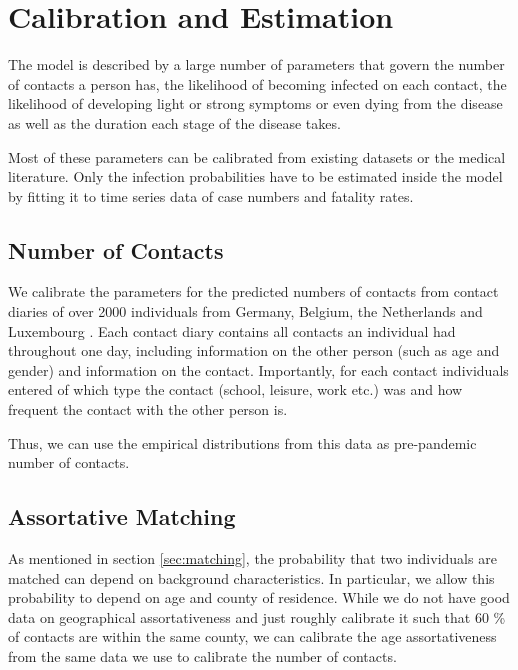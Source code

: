 \section{Calibration and Estimation}
\label{sec:calibration_and_estimation}

The model is described by a large number of parameters that govern the number of
contacts a person has, the likelihood of becoming infected on each contact, the
likelihood of developing light or strong symptoms or even dying from the disease as well
as the duration each stage of the disease takes.

Most of these parameters can be calibrated from existing datasets or the medical
literature. Only the infection probabilities have to be estimated inside the model by
fitting it to time series data of case numbers and fatality rates.





\subsection{Number of Contacts}
\label{sub:number_of_contacts}

We calibrate the parameters for the predicted numbers of contacts from contact diaries
of over 2000 individuals from Germany, Belgium, the Netherlands and Luxembourg
\citep{Mossong2008}. Each contact diary contains all contacts an individual had
throughout one day, including information on the other person (such as age and gender)
and information on the contact. Importantly, for each contact individuals entered of
which type the contact (school, leisure, work etc.) was and how frequent the contact
with the other person is.

Thus, we can use the empirical distributions from this data as pre-pandemic number of
contacts.


\subsection{Assortative Matching}

As mentioned in section \ref{sec:matching}, the probability that two individuals are
matched can depend on background characteristics. In particular, we allow this
probability to depend on age and county of residence. While we do not have good data on
geographical assortativeness and just roughly calibrate it such that 60 \% of contacts
are within the same county\footnotemark, we can calibrate the age assortativeness from
the same data we use to calibrate the number of contacts.

